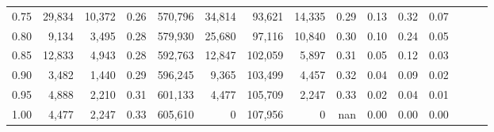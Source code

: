 \begin{tabular}{rrrrrrrrrrrrrrr}
0.75 &  29,834 &  10,372 &  0.26 &  570,796 &   34,814 &   93,621 &   14,335 &  0.29 &  0.13 &  0.32 &      0.07 \\
0.80 &   9,134 &   3,495 &  0.28 &  579,930 &   25,680 &   97,116 &   10,840 &  0.30 &  0.10 &  0.24 &      0.05 \\
0.85 &  12,833 &   4,943 &  0.28 &  592,763 &   12,847 &  102,059 &    5,897 &  0.31 &  0.05 &  0.12 &      0.03 \\
0.90 &   3,482 &   1,440 &  0.29 &  596,245 &    9,365 &  103,499 &    4,457 &  0.32 &  0.04 &  0.09 &      0.02 \\
0.95 &   4,888 &   2,210 &  0.31 &  601,133 &    4,477 &  105,709 &    2,247 &  0.33 &  0.02 &  0.04 &      0.01 \\
1.00 &   4,477 &   2,247 &  0.33 &  605,610 &        0 &  107,956 &        0 &   nan &  0.00 &  0.00 &      0.00 \\
\bottomrule
\end{tabular}

